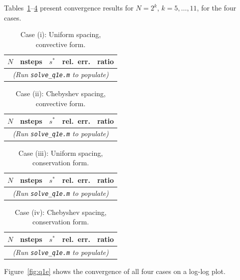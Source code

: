 \documentclass[11pt]{article}
\begin{document}
Tables~\ref{tab:q1e_i}--\ref{tab:q1e_iv} present convergence results for $N = 2^k$, $k = 5, \ldots, 11$, for the four cases.

\begin{table}[H]
\centering
\caption{Case (i): Uniform spacing, convective form.}
\label{tab:q1e_i}
\begin{tabular}{@{}rrrrr@{}}
\toprule
$N$ & nsteps & $s^*$ & rel.~err. & ratio \\
\midrule
\multicolumn{5}{c}{\emph{(Run \texttt{solve\_q1e.m} to populate)}} \\
\bottomrule
\end{tabular}
\end{table}

\begin{table}[H]
\centering
\caption{Case (ii): Chebyshev spacing, convective form.}
\label{tab:q1e_ii}
\begin{tabular}{@{}rrrrr@{}}
\toprule
$N$ & nsteps & $s^*$ & rel.~err. & ratio \\
\midrule
\multicolumn{5}{c}{\emph{(Run \texttt{solve\_q1e.m} to populate)}} \\
\bottomrule
\end{tabular}
\end{table}

\begin{table}[H]
\centering
\caption{Case (iii): Uniform spacing, conservation form.}
\label{tab:q1e_iii}
\begin{tabular}{@{}rrrrr@{}}
\toprule
$N$ & nsteps & $s^*$ & rel.~err. & ratio \\
\midrule
\multicolumn{5}{c}{\emph{(Run \texttt{solve\_q1e.m} to populate)}} \\
\bottomrule
\end{tabular}
\end{table}

\begin{table}[H]
\centering
\caption{Case (iv): Chebyshev spacing, conservation form.}
\label{tab:q1e_iv}
\begin{tabular}{@{}rrrrr@{}}
\toprule
$N$ & nsteps & $s^*$ & rel.~err. & ratio \\
\midrule
\multicolumn{5}{c}{\emph{(Run \texttt{solve\_q1e.m} to populate)}} \\
\bottomrule
\end{tabular}
\end{table}

Figure~\ref{fig:q1e} shows the convergence of all four cases on a log-log plot.
\end{document}
